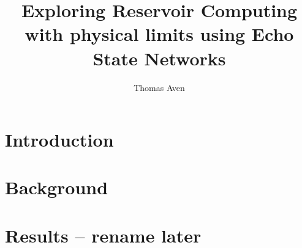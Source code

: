 \documentclass[journal]{IEEEtran}
\begin{document}
\title{Exploring Reservoir Computing with physical limits using Echo State Networks}
\author{Thomas Aven}
\date{}
\maketitle



\section{Introduction}


\section{Background}


\section{Results -- rename later}




\end{document}
